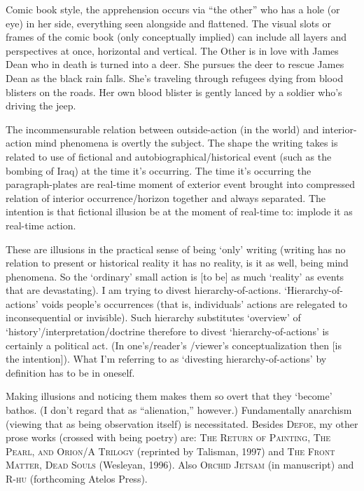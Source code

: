\documentclass[
]{memoir}
\begin{document}
Comic book style, the apprehension occurs via ``the other'' who has a
hole (or eye) in her side, everything seen alongside and flattened. The
visual slots or frames of the comic book (only conceptually implied) can
include all layers and perspectives at once, horizontal and vertical.
The Other is in love with James Dean who in death is turned into a deer.
She pursues the deer to rescue James Dean as the black rain falls. She's
traveling through refugees dying from blood blisters on the roads. Her
own blood blister is gently lanced by a soldier who's driving the jeep.

The incommensurable relation between outside-action (in the world) and
interior-action mind phenomena is overtly the subject. The shape the
writing takes is related to use of fictional and
autobiographical/historical event (such as the bombing of Iraq) at the
time it's occurring. The time it's occurring the paragraph-plates are
real-time moment of exterior event brought into compressed relation of
interior occurrence/horizon together and always separated. The intention
is that fictional illusion be at the moment of real-time to: implode it
as real-time action.

These are illusions in the practical sense of being `only' writing
(writing has no relation to present or historical reality it has no
reality, is it as well, being mind phenomena. So the `ordinary' small
action is {[}to be{]} as much `reality' as events that are devastating).
I am trying to divest hierarchy-of-actions. `Hierarchy-of-actions' voids
people's occurrences (that is, individuals' actions are relegated to
inconsequential or invisible). Such hierarchy substitutes `overview' of
`history'/interpretation/doctrine therefore to divest
`hierarchy-of-actions' is certainly a political act. (In one's/reader's
/viewer's conceptualization then {[}is the intention{]}). What I'm
referring to as `divesting hierarchy-of-actions' by definition has to be
in oneself.

Making illusions and noticing them makes them so overt that they
`become' bathos. (I don't regard that as ``alienation,'' however.)
Fundamentally anarchism (viewing that as being observation itself) is
necessitated. Besides \textsc{Defoe}, my other prose works (crossed with
being poetry) are: \textsc{The Return of Painting}, \textsc{The Pearl,
and Orion/A Trilogy} (reprinted by Talisman, 1997) and \textsc{The Front
Matter, Dead Souls} (Wesleyan, 1996). Also \textsc{Orchid Jetsam} (in
manuscript) and \textsc{R-hu} (forthcoming Atelos Press).
\end{document}
